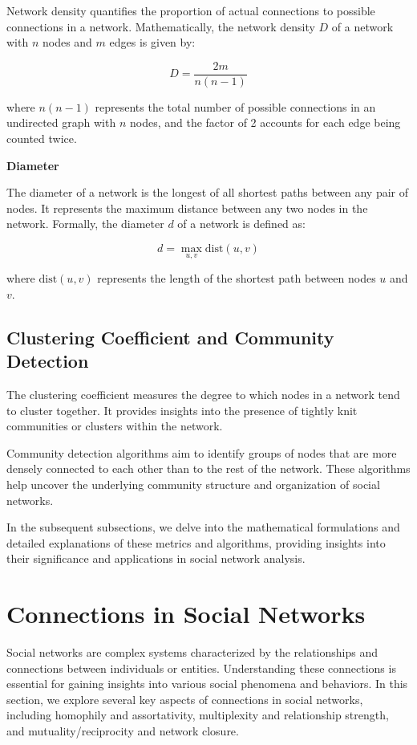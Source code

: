 \documentclass[12pt]{book} %
\begin{document}
Network density quantifies the proportion of actual connections to possible connections in a network. Mathematically, the network density \(D\) of a network with \(n\) nodes and \(m\) edges is given by:

\[ D = \frac{2m}{n(n-1)} \]

where \(n(n-1)\) represents the total number of possible connections in an undirected graph with \(n\) nodes, and the factor of 2 accounts for each edge being counted twice.

\textbf{Diameter}

The diameter of a network is the longest of all shortest paths between any pair of nodes. It represents the maximum distance between any two nodes in the network. Formally, the diameter \(d\) of a network is defined as:

\[ d = \max_{u,v} \text{dist}(u,v) \]

where \(\text{dist}(u,v)\) represents the length of the shortest path between nodes \(u\) and \(v\).

\subsection{Clustering Coefficient and Community Detection}

The clustering coefficient measures the degree to which nodes in a network tend to cluster together. It provides insights into the presence of tightly knit communities or clusters within the network.

Community detection algorithms aim to identify groups of nodes that are more densely connected to each other than to the rest of the network. These algorithms help uncover the underlying community structure and organization of social networks.

In the subsequent subsections, we delve into the mathematical formulations and detailed explanations of these metrics and algorithms, providing insights into their significance and applications in social network analysis.


\section{Connections in Social Networks}

Social networks are complex systems characterized by the relationships and connections between individuals or entities. Understanding these connections is essential for gaining insights into various social phenomena and behaviors. In this section, we explore several key aspects of connections in social networks, including homophily and assortativity, multiplexity and relationship strength, and mutuality/reciprocity and network closure.
\end{document}
